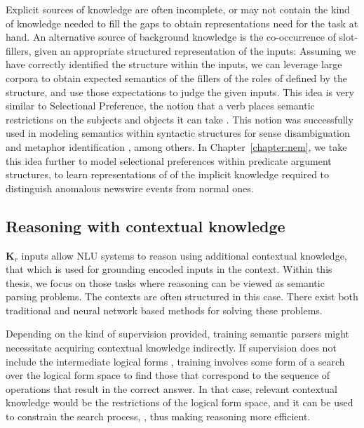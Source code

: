 Explicit sources of knowledge are often incomplete, or may not contain the kind of knowledge needed
to fill the gaps to obtain representations need for the task at hand.  An alternative source of
background knowledge is the co-occurrence of slot-fillers, given an appropriate structured
representation of the inputs: Assuming we have correctly identified the structure within the inputs,
we can leverage large corpora to obtain expected semantics of the fillers of the roles of defined by
the structure, and use those expectations to judge the given inputs.  This idea is very similar to
Selectional Preference, the notion that a verb places semantic restrictions on the subjects and
objects it can take \citep{katz1963structure,wilks1975preferential}.  This notion was successfully
used in modeling semantics within syntactic structures for sense disambiguation
\citep{resnik1997selectional} and metaphor identification \citep{shutova2013statistical}, among
others.  In Chapter~\ref{chapter:nem}, we take this idea further to model selectional preferences
within predicate argument structures, to learn representations of of the implicit knowledge required
to distinguish anomalous newswire events from normal ones.

\subsection{Reasoning with contextual knowledge} $\textbf{K}_r$ inputs allow NLU systems to reason
using additional contextual knowledge, that which is used for grounding encoded inputs in the context.
Within this thesis, we focus on those tasks where reasoning
can be viewed as semantic parsing problems.  The contexts are often structured in this case. There
exist both traditional \citep[among
others]{Zelle1996LearningTP,Zettlemoyer2005LearningTM,zettlemoyer2007online} and neural network
based methods
\citep{Dong2016LanguageTL,Andreas2016LearningTC,Liang2016NeuralSM,Neelakantan2016LearningAN} for
solving these problems. 

Depending on the kind of supervision provided, training semantic parsers might necessitate acquiring
contextual knowledge indirectly. If supervision does not include the intermediate logical forms
\citep{berant2013semantic,pasupat2015compositional,krishnamurthy2017neural}, training
involves some form of a search over the logical form space to find those that correspond to the
sequence of operations that result in the correct answer.  In that case, relevant contextual knowledge
would be the restrictions of the logical form space, and it can be used to constrain the search process,
\citep{xiao2016sequence,krishnamurthy2017neural}, thus making reasoning more efficient.

